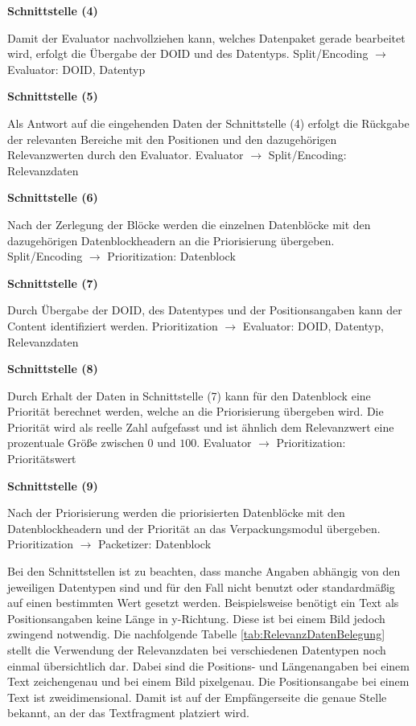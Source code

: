\textbf{Schnittstelle (4)}

Damit der Evaluator nachvollziehen kann, welches Datenpaket gerade bearbeitet
wird, erfolgt die Übergabe der \gls{DOID} und des Datentyps. \newline
Split/Encoding $\rightarrow$ Evaluator: \gls{DOID}, Datentyp

\textbf{Schnittstelle (5)}

Als Antwort auf die eingehenden Daten der Schnittstelle (4)
erfolgt die Rückgabe der relevanten Bereiche mit den Positionen und den
dazugehörigen Relevanzwerten durch den Evaluator. \newline
Evaluator $\rightarrow$ Split/Encoding: Relevanzdaten   

\textbf{Schnittstelle (6)}

Nach der Zerlegung der Blöcke werden die einzelnen
Datenblöcke mit den dazugehörigen Datenblockheadern an die
Priorisierung übergeben. \newline
Split/Encoding $\rightarrow$ Prioritization: Datenblock

\textbf{Schnittstelle (7)}

Durch Übergabe der \gls{DOID}, des Datentypes und der Positionsangaben kann der
Content identifiziert werden. \newline
Prioritization $\rightarrow$ Evaluator: \gls{DOID}, Datentyp, Relevanzdaten

\textbf{Schnittstelle (8)}

Durch Erhalt der Daten in Schnittstelle (7) kann für
den Datenblock eine Priorität berechnet werden, welche an die Priorisierung übergeben
wird. Die Priorität wird als reelle Zahl aufgefasst und ist ähnlich dem
Relevanzwert eine prozentuale Größe zwischen $0$ und $100$. \newline
Evaluator $\rightarrow$ Prioritization: Prioritätswert

\textbf{Schnittstelle (9)}

Nach der Priorisierung werden die priorisierten Datenblöcke mit den
Datenblockheadern und der Priorität an das Verpackungsmodul übergeben. \newline
Prioritization $\rightarrow$ Packetizer: Datenblock

Bei den Schnittstellen ist zu beachten, dass manche Angaben abhängig von den
jeweiligen Datentypen sind und für den Fall nicht benutzt oder
standardmäßig auf einen bestimmten Wert gesetzt werden. Beispielsweise benötigt
ein Text als Positionsangaben keine Länge in y-Richtung. Diese ist bei einem
Bild jedoch zwingend notwendig. Die nachfolgende Tabelle
\ref{tab:RelevanzDatenBelegung} stellt die Verwendung der Relevanzdaten bei
verschiedenen Datentypen noch einmal übersichtlich dar. Dabei sind die
Positions- und Längenangaben bei einem Text zeichengenau und bei einem Bild
pixelgenau. Die Positionsangabe bei einem Text ist zweidimensional. Damit ist
auf der Empfängerseite die genaue Stelle bekannt, an der das Textfragment
platziert wird.


